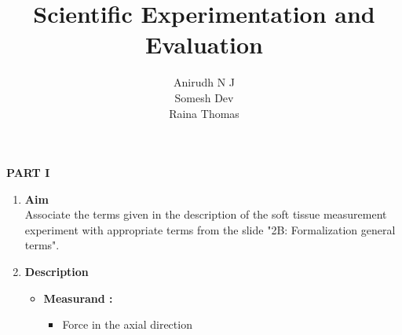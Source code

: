 \documentclass[10pt,a4paper]{article}
\author{\vspace{0.4cm}
	Anirudh N J \\\vspace{0.4cm}
	Somesh Dev \\\vspace{0.8cm}
	Raina Thomas}
\title{
	\vspace*{5cm}
	\textbf{Scientific Experimentation and Evaluation}
	}
\begin{document}
	
\begin{titlepage}

	\maketitle
	
\end{titlepage}

\Large\textbf{PART I}	

\Large
\begin{enumerate}[label=\Roman*]
	\item
	\Large{\textbf{Aim}}\\
	
	Associate the terms given in the description of the soft tissue measurement experiment with appropriate terms from the slide "2B: Formalization general terms".
	\vspace{0.3cm}
	\item
	\Large{\textbf{Description}}\\
	
	\begin{itemize}
		\item	
		\textbf{Measurand :}
		\begin{itemize}
			\item
			Force in the axial direction
		\end{itemize}
		

\end{itemize}
\end{enumerate}
\end{document}
